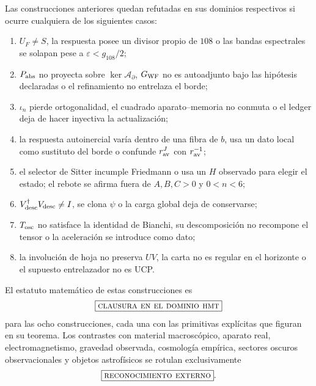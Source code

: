 Las construcciones anteriores quedan refutadas en sus dominios respectivos
si ocurre cualquiera de los siguientes casos:

\begin{enumerate}
 \setlength{\itemsep}{0.15\baselineskip}
 \item \(U_F\neq S\), la respuesta posee un divisor propio de \(108\) o las
 bandas espectrales se solapan pese a \(\varepsilon<g_{108}/2\);
 \item \(P_{\rm abs}\) no proyecta sobre
 \(\ker\mathcal A_\partial\), \(G_{\rm WF}\) no es autoadjunto bajo las
 hipótesis declaradas o el refinamiento no entrelaza el borde;
 \item \(\iota_n\) pierde ortogonalidad, el cuadrado aparato--memoria no
 conmuta o el ledger deja de hacer inyectiva la actualización;
 \item la respuesta autoinercial varía dentro de una fibra de \(b\), usa un
 dato local como sustituto del borde o confunde
 \(r_{\rm av}^J\) con \(r_{\rm av}^{-1}\);
 \item el selector de Sitter incumple Friedmann o usa un \(H\) observado
 para elegir el estado; el rebote se afirma fuera de
 \(A,B,C>0\) y \(0<n<6\);
 \item \(V_{\rm desc}^{\dagger}V_{\rm desc}\neq I\), se clona \(\psi\) o
 la carga global deja de conservarse;
 \item \(T_{\rm osc}\) no satisface la identidad de Bianchi, su
 descomposición no recompone el tensor o la aceleración se introduce como
 dato;
 \item la involución de hoja no preserva \(UV\), la carta no es regular en
 el horizonte o el supuesto entrelazador no es UCP.
\end{enumerate}

\enlargethispage{4\baselineskip}
El estatuto matemático de estas construcciones es
\[
 \boxed{\textsc{clausura en el dominio hmt}}
\]
para las ocho construcciones, cada una con las primitivas explícitas que
figuran en su teorema. Los contrastes con material macroscópico, aparato
real, electromagnetismo, gravedad observada, cosmología empírica, sectores
oscuros observacionales y objetos astrofísicos se rotulan exclusivamente
\[
 \boxed{\textsc{reconocimiento externo}}.
\]

